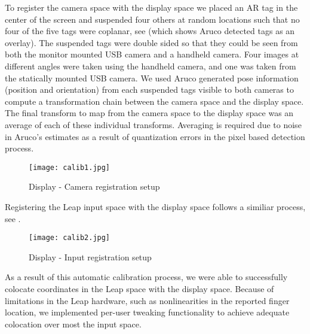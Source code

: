 To register the camera space with the display space we placed an AR tag in the
center of the screen and suspended four others at random locations such that
no four of the five tags were coplanar, see  (which shows
Aruco detected tags as an overlay).  The suspended tags were double sided so
that they could be seen from both the monitor mounted USB camera and a
handheld camera.  Four images at different angles were taken using the
handheld camera, and one was taken from the statically mounted USB camera.  We
used Aruco generated pose information (position and orientation) from each
suspended tags visible to both cameras to compute a transformation chain
between the camera space and the display space.  The final transform to map
from the camera space to the display space was an average of each of these
individual transforms.  Averaging is required due to noise in Aruco's
estimates as a result of quantization errors in the pixel based detection
process.

\begin{figure}
    \centering
    \texttt{[image: calib1.jpg]}
    \caption{Display - Camera registration setup}
    \label{fig:calib1}
\end{figure}

Registering the Leap input space with the display space follows a similiar process, see .

\begin{figure}
    \centering
    \texttt{[image: calib2.jpg]}
    \caption{Display - Input registration setup}
    \label{fig:calib2}
\end{figure}

As a result of this automatic calibration process, we were able to
successfully colocate coordinates in the Leap space with the display space.
Because of limitations in the Leap hardware, such as nonlinearities in the
reported finger location, we implemented per-user tweaking functionality to
achieve adequate colocation over most the input space.
